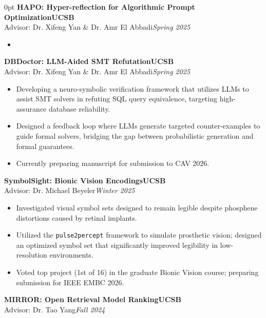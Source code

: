 \documentclass[11pt]{article}
\newlength{\sectionwidth}
\newcommand{\CVSection}[2]{%
  \vspace{1.4em} 
  \noindent
  \makebox[0pt][l]{%
    \parbox[t]{\sectionwidth}{%
      \raggedright\scshape\bfseries\small #1%
    }%
  }%
  \begin{adjustwidth}{\sectionwidth}{0pt}
    #2
  \end{adjustwidth}
}
\newcommand{\CVEntry}[4]{%
  \vspace{0.4em} %
  {\bfseries #1}\hfill {\bfseries #2}\\[0.1em] 
  #3\hfill \textit{#4}
}
\begin{document}
\CVSection{Research\\Experience}{%
\CVEntry
{HAPO: Hyper-reflection for Algorithmic Prompt Optimization}
    {UCSB}
    {Advisor: Dr. Xifeng Yan \& Dr. Amr El Abbadi}
    {Spring 2025}
  \begin{itemize}
    \item  

  \end{itemize}
\CVEntry
{DBDoctor: LLM-Aided SMT Refutation}
    {UCSB}
    {Advisor: Dr. Xifeng Yan \& Dr. Amr El Abbadi}
    {Spring 2025}
  \begin{itemize}
    \item Developing a neuro-symbolic verification framework that utilizes LLMs to assist SMT solvers in refuting SQL query equivalence, targeting high-assurance database reliability.
    \item Designed a feedback loop where LLMs generate targeted counter-examples to guide formal solvers, bridging the gap between probabilistic generation and formal guarantees.
    \item Currently preparing manuscript for submission to CAV 2026.
  \end{itemize}
  \vspace{0.4em}
  \CVEntry
    {SymbolSight: Bionic Vision Encodings}
    {UCSB}
    {Advisor: Dr. Michael Beyeler}
    {Winter 2025}
  \begin{itemize}
    \item Investigated visual symbol sets designed to remain legible despite phosphene distortions caused by retinal implants.
    \item Utilized the \texttt{pulse2percept} framework to simulate prosthetic vision; designed an optimized symbol set that significantly improved legibility in low-resolution environments.
    \item Voted top project (1st of 16) in the graduate Bionic Vision course; preparing submission for IEEE EMBC 2026.
  \end{itemize}
  \vspace{0.4em}
  \CVEntry
    {MIRROR: Open Retrieval Model Ranking}
    {UCSB}
    {Advisor: Dr. Tao Yang}
    {Fall 2024}
  \begin{itemize}

\end{itemize}}
\end{document}
